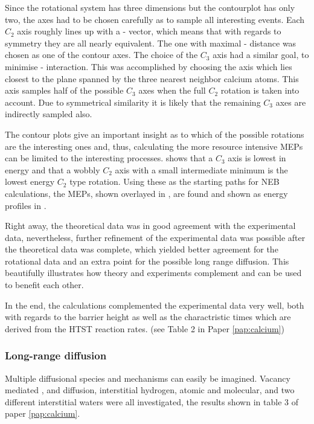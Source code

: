 Since the rotational system has three dimensions but the contourplot has only two, the axes had to be chosen carefully as to sample all interesting events.
Each $C_2$ axis roughly lines up with a - vector, which means that with regards to symmetry they are all nearly equivalent.
The one with maximal - distance was chosen as one of the contour axes.
The choice of the $C_3$ axis had a similar goal, to minimise - interaction.
This was accomplished by choosing the axis which lies closest to the plane spanned by the three nearest neighbor calcium atoms.
This axis samples half of the possible $C_3$ axes when the full $C_2$ rotation is taken into account.
Due to symmetrical similarity it is likely that the remaining $C_3$ axes are indirectly sampled also.

The contour plots give an important insight as to which of the possible rotations are the interesting ones and, thus, calculating the more resource intensive MEPs can be limited to the interesting processes.
 shows that a $C_3$ axis is lowest in energy and that a wobbly $C_2$ axis with a small intermediate minimum is the lowest energy $C_2$ type rotation.
Using these as the starting paths for NEB calculations, the MEPs, shown overlayed in , are found and shown as energy profiles in .

Right away, the theoretical data was in good agreement with the experimental data, nevertheless, further refinement of the experimental data was possible after the theoretical data was complete, which yielded better agreement for the rotational data and an extra point for the possible long range diffusion.
This beautifully illustrates how theory and experiments complement and can be used to benefit each other.

In the end, the calculations complemented the experimental data very well, both with regards to the barrier height as well as the charactristic times which are derived from the HTST reaction rates. (see Table 2 in Paper \ref{pap:calcium})

\subsubsection{Long-range diffusion}
Multiple diffusional species and mechanisms can easily be imagined.
Vacancy mediated ,   and  diffusion, interstitial hydrogen, atomic and molecular, and two different interstitial waters were all investigated, the results shown in table 3 of paper \ref{pap:calcium}.


